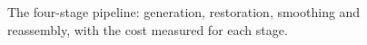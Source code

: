 \begin{figure}[t]
\begin{tikzpicture}
  \end{tikzpicture}
  \caption{The four-stage pipeline: generation, restoration, smoothing and
    reassembly, with the cost measured for each stage.}
  \label{fig:pipeline_overview}
\end{figure}
